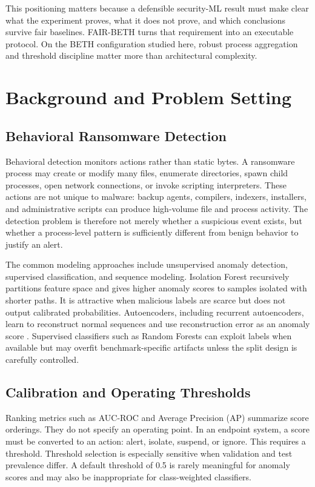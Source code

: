 \documentclass[journal]{IEEEtran}
\begin{document}
This positioning matters because a defensible security-ML result must make clear what the experiment proves, what it does not prove, and which conclusions survive fair baselines. FAIR-BETH turns that requirement into an executable protocol. On the BETH configuration studied here, robust process aggregation and threshold discipline matter more than architectural complexity.

\section{Background and Problem Setting}
\label{sec:background}

\subsection{Behavioral Ransomware Detection}

Behavioral detection monitors actions rather than static bytes. A ransomware process may create or modify many files, enumerate directories, spawn child processes, open network connections, or invoke scripting interpreters. These actions are not unique to malware: backup agents, compilers, indexers, installers, and administrative scripts can produce high-volume file and process activity. The detection problem is therefore not merely whether a suspicious event exists, but whether a process-level pattern is sufficiently different from benign behavior to justify an alert.

The common modeling approaches include unsupervised anomaly detection, supervised classification, and sequence modeling. Isolation Forest \cite{liu2008} recursively partitions feature space and gives higher anomaly scores to samples isolated with shorter paths. It is attractive when malicious labels are scarce but does not output calibrated probabilities. Autoencoders, including recurrent autoencoders, learn to reconstruct normal sequences and use reconstruction error as an anomaly score \cite{cho2014,du2017}. Supervised classifiers such as Random Forests \cite{breiman2001} can exploit labels when available but may overfit benchmark-specific artifacts unless the split design is carefully controlled.

\subsection{Calibration and Operating Thresholds}

Ranking metrics such as AUC-ROC and Average Precision (AP) summarize score orderings. They do not specify an operating point. In an endpoint system, a score must be converted to an action: alert, isolate, suspend, or ignore. This requires a threshold. Threshold selection is especially sensitive when validation and test prevalence differ. A default threshold of 0.5 is rarely meaningful for anomaly scores and may also be inappropriate for class-weighted classifiers.
\end{document}
